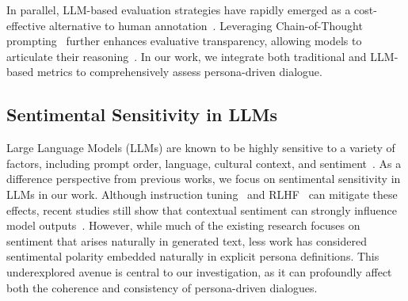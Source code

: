 In parallel, LLM-based evaluation strategies have rapidly emerged as a cost-effective alternative to human annotation~\cite{chiang2023can}. Leveraging Chain-of-Thought prompting~\cite{wei2022chain} further enhances evaluative transparency, allowing models to articulate their reasoning~\cite{liu2023g}. In our work, we integrate both traditional and LLM-based metrics to comprehensively assess persona-driven dialogue.

\subsection{Sentimental Sensitivity in LLMs}
\label{sec:related.3} 
Large Language Models (LLMs) are known to be highly sensitive to a variety of factors, including prompt order, language, cultural context, and sentiment~\cite{lu2021fantastically, dang2024rlhf, shen2024understanding, kwok2024evaluating}. As a difference perspective from previous works, we focus on sentimental sensitivity in LLMs in our work.
Although instruction tuning~\cite{ouyang2022training} and RLHF~\cite{dang2024rlhf} can mitigate these effects, recent studies still show that contextual sentiment can strongly influence model outputs~\cite{liu2024large, wu2024evaluating}. However, while much of the existing research focuses on sentiment that arises naturally in generated text, less work has considered sentimental polarity embedded naturally in explicit persona definitions. This underexplored avenue is central to our investigation, as it can profoundly affect both the coherence and consistency of persona-driven dialogues.